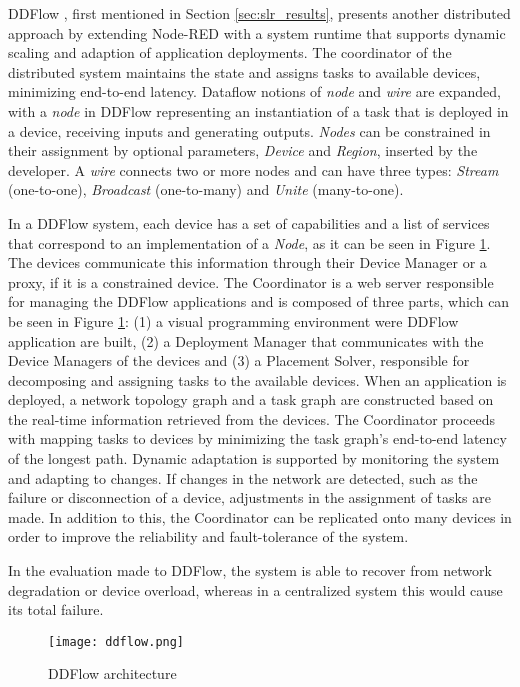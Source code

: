 DDFlow \cite{ddflow}, first mentioned in Section \ref{sec:slr_results}, presents another distributed approach by extending Node-RED with a system runtime that supports dynamic scaling and adaption of application deployments. The coordinator of the distributed system maintains the state and assigns tasks to available devices, minimizing end-to-end latency. Dataflow notions of \textit{node} and \textit{wire} are expanded, with a \textit{node} in DDFlow representing an instantiation of a task that is deployed in a device, receiving inputs and generating outputs. \textit{Nodes} can be constrained in their assignment by optional parameters, \textit{Device} and \textit{Region}, inserted by the developer. A \textit{wire} connects two or more nodes and can have three types: \textit{Stream} (one-to-one), \textit{Broadcast} (one-to-many) and \textit{Unite} (many-to-one). 

In a DDFlow system, each device has a set of capabilities and a list of services that correspond to an implementation of a \textit{Node}, as it can be seen in Figure \ref{fig:ddflow}. The devices communicate this information through their Device Manager or a proxy, if it is a constrained device. The Coordinator is a web server responsible for managing the DDFlow applications and is composed of three parts, which can be seen in Figure \ref{fig:ddflow}: (1) a visual programming environment were DDFlow application are built, (2) a Deployment Manager that communicates with the Device Managers of the devices and (3) a Placement Solver, responsible for decomposing and assigning tasks to the available devices. When an application is deployed, a network topology graph and a task graph are constructed based on the real-time information retrieved from the devices. The Coordinator proceeds with mapping tasks to devices by minimizing the task graph's end-to-end latency of the longest path. Dynamic adaptation is supported by monitoring the system and adapting to changes. If changes in the network are detected, such as the failure or disconnection of a device, adjustments in the assignment of tasks are made. In addition to this, the Coordinator can be replicated onto many devices in order to improve the reliability and fault-tolerance of the system.

In the evaluation made to DDFlow, the system is able to recover from network degradation or device overload, whereas in a centralized system this would cause its total failure.

\begin{figure}[h]
\caption{DDFlow architecture}
\label{fig:ddflow}
\centering
\texttt{[image: ddflow.png]}
\end{figure}

